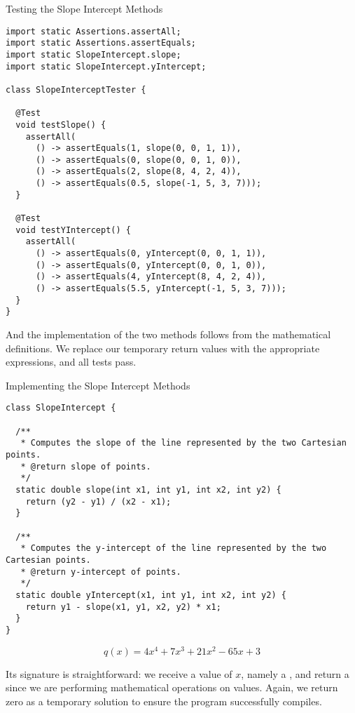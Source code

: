 \begin{cl}{Testing the Slope Intercept Methods}
\begin{lstlisting}[language=MyJava]
import static Assertions.assertAll;
import static Assertions.assertEquals;
import static SlopeIntercept.slope;
import static SlopeIntercept.yIntercept;

class SlopeInterceptTester {
  
  @Test
  void testSlope() {
    assertAll(
      () -> assertEquals(1, slope(0, 0, 1, 1)),
      () -> assertEquals(0, slope(0, 0, 1, 0)),
      () -> assertEquals(2, slope(8, 4, 2, 4)),
      () -> assertEquals(0.5, slope(-1, 5, 3, 7)));
  }

  @Test
  void testYIntercept() {
    assertAll(
      () -> assertEquals(0, yIntercept(0, 0, 1, 1)),
      () -> assertEquals(0, yIntercept(0, 0, 1, 0)),
      () -> assertEquals(4, yIntercept(8, 4, 2, 4)),
      () -> assertEquals(5.5, yIntercept(-1, 5, 3, 7)));
  }
}
\end{lstlisting}
\end{cl}

And the implementation of the two methods follows from the mathematical definitions. We replace our temporary  return values with the appropriate expressions, and all tests pass.

\begin{cl}{Implementing the Slope Intercept Methods}
\begin{lstlisting}[language=MyJava]
class SlopeIntercept {

  /**
   * Computes the slope of the line represented by the two Cartesian points.
   * @return slope of points.
   */
  static double slope(int x1, int y1, int x2, int y2) {
    return (y2 - y1) / (x2 - x1);
  }

  /**
   * Computes the y-intercept of the line represented by the two Cartesian points.
   * @return y-intercept of points.
   */
  static double yIntercept(x1, int y1, int x2, int y2) {
    return y1 - slope(x1, y1, x2, y2) * x1;
  }
}
\end{lstlisting}
\end{cl}


\[
q(x) = 4x^4 + 7x^3 + 21x^2 - 65x + 3
\]

Its signature is straightforward: we receive a value of $x$, namely a , and return a  since we are performing mathematical operations on  values. Again, we return zero as a temporary solution to ensure the program successfully compiles.
 
